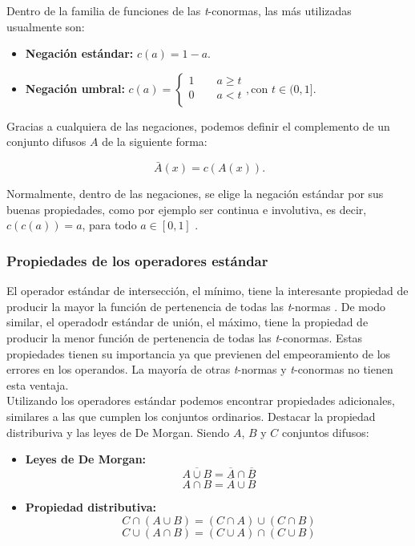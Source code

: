 Dentro de la familia de funciones de las \textit{t}-conormas, las más utilizadas usualmente son:

\begin{itemize}
\item \textbf{Negación estándar:} $c(a)= 1-a$.
\item \textbf{Negación umbral:} $c(a)= \left\lbrace
  \begin{array}{l}
     1 \qquad a \geq t \\
     0 \qquad a < t \\
  \end{array}
  \right. , \textrm{con } t\in (0,1]$.
\end{itemize}

Gracias a cualquiera de las negaciones, podemos definir el complemento de un conjunto difusos $A$ de la siguiente forma:

\[
\ \bar{A}(x)= c(A(x)).
\]

Normalmente, dentro de las negaciones, se elige la negación estándar por sus buenas propiedades, como por ejemplo ser continua e involutiva, es decir, $c\left(c\left(a\right)\right)=a$, para todo $a \in [0,1]$ .

\subsubsection{Propiedades de los operadores estándar}

El operador estándar de intersección, el mínimo, tiene la interesante propiedad de producir la mayor la función de pertenencia de todas las \textit{t}-normas . De modo similar, el operadodr estándar de unión, el máximo, tiene la propiedad de producir la menor función de pertenencia de todas las \textit{t}-conormas. Estas propiedades tienen su importancia ya que previenen del empeoramiento de los errores en los operandos. La mayoría de otras \textit{t}-normas y \textit{t}-conormas no tienen esta ventaja.\\

Utilizando los operadores estándar podemos encontrar propiedades adicionales, similares a las que cumplen los conjuntos ordinarios. Destacar la propiedad distriburiva y las leyes de De Morgan. Siendo $A$, $B$ y $C$ conjuntos difusos:

\begin{itemize}
\item \textbf{Leyes de De Morgan:}
\[
\ \overline{A \cup B} = \overline{A} \cap \overline{B}
\]
\[
\ \overline{A \cap B} = \overline{A} \cup \overline{B}
\]
\item \textbf{Propiedad distributiva:}
\[
\ C \cap \left( A \cup B \right) = \left(C \cap A \right) \cup \left(C \cap B \right)
\]
\[
\ C \cup \left( A \cap B \right) = \left(C \cup A \right) \cap \left(C \cup B \right)
\]
\end{itemize}

